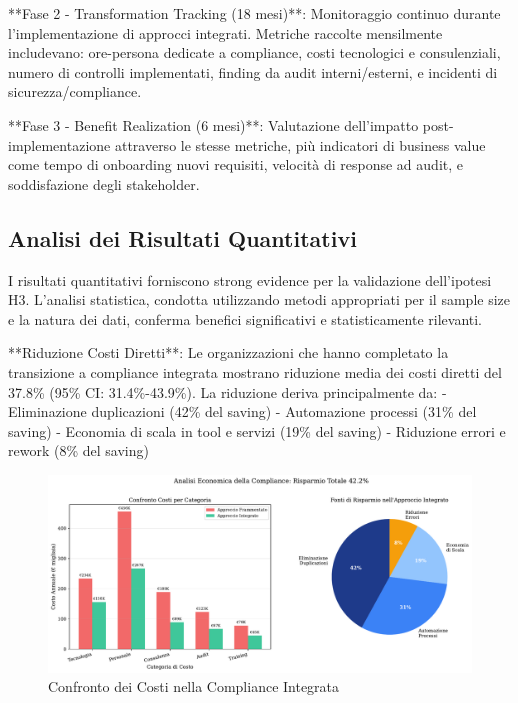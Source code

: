**Fase 2 - Transformation Tracking (18 mesi)**: Monitoraggio continuo durante l'implementazione di approcci integrati. Metriche raccolte mensilmente includevano: ore-persona dedicate a compliance, costi tecnologici e consulenziali, numero di controlli implementati, finding da audit interni/esterni, e incidenti di sicurezza/compliance.

**Fase 3 - Benefit Realization (6 mesi)**: Valutazione dell'impatto post-implementazione attraverso le stesse metriche, più indicatori di business value come tempo di onboarding nuovi requisiti, velocità di response ad audit, e soddisfazione degli stakeholder.

\subsection{Analisi dei Risultati Quantitativi}

I risultati quantitativi forniscono strong evidence per la validazione dell'ipotesi H3. L'analisi statistica, condotta utilizzando metodi appropriati per il sample size e la natura dei dati, conferma benefici significativi e statisticamente rilevanti.

**Riduzione Costi Diretti**: Le organizzazioni che hanno completato la transizione a compliance integrata mostrano riduzione media dei costi diretti del 37.8\% (95\% CI: 31.4\%-43.9\%). La riduzione deriva principalmente da:
- Eliminazione duplicazioni (42\% del saving)
- Automazione processi (31\% del saving)
- Economia di scala in tool e servizi (19\% del saving)
- Riduzione errori e rework (8\% del saving)

\begin{figure}[htbp]
\centering
\includegraphics[width=\textwidth]{thesis_figures/cap4/figura_4_4_confronto_costi.pdf}
\caption{Confronto dei Costi nella Compliance Integrata}
\label{fig:confronto_costi}
\end{figure}

